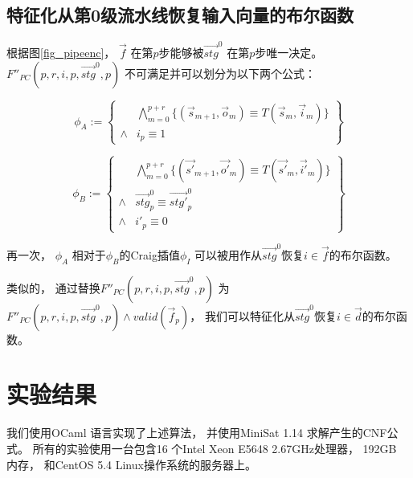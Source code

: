 \subsection{特征化从第0级流水线恢复输入向量的布尔函数}

根据图\ref{fig_pipeenc}，
$\vec{f}$ 在第$p$步能够被$\vec{stg}^0$ 在第$p$步唯一决定。
$F''_{PC}(p,r,i,p,\vec{stg}^0,p)$ 不可满足并可以划分为以下两个公式：

\begin{equation}
\phi_A:=
\left\{
\begin{array}{cc}
&\bigwedge_{m=0}^{p+r}
\{
(\vec{s}_{m+1},\vec{o}_m)\equiv T(\vec{s}_m,\vec{i}_m)
\}
\\
\wedge& i_{p}\equiv 1
\end{array}
\right\}
\end{equation}

\begin{equation}
\phi_B:=
\left\{
\begin{array}{cc}
&\bigwedge_{m=0}^{p+r}
\{
(\vec{s'}_{m+1},\vec{o'}_m)\equiv T(\vec{s'}_m,\vec{i'}_m)
\}
\\
\wedge&\vec{stg}^0_p\equiv \vec{stg'}^0_p \\
\wedge& i'_{p}\equiv 0
\end{array}
\right\}
\end{equation}

再一次，
$\phi_A$ 相对于$\phi_B$的Craig插值$\phi_I$
可以被用作从$\vec{stg}^0$恢复$i\in\vec{f}$的布尔函数。

类似的，
通过替换$F''_{PC}(p,r,i,p,\vec{stg}^0,p)$ 为$F''_{PC}(p,r,i,p,\vec{stg}^0,p)\wedge valid(\vec{f}_p)$，
我们可以特征化从$\vec{stg}^0$恢复$i\in\vec{d}$的布尔函数。



\section{实验结果}\label{sec_exp}
我们使用OCaml 语言实现了上述算法，
并使用MiniSat 1.14 求解产生的CNF公式。
所有的实验使用一台包含16 个Intel Xeon E5648 2.67GHz处理器，
192GB 内存， 和CentOS 5.4 Linux操作系统的服务器上。

